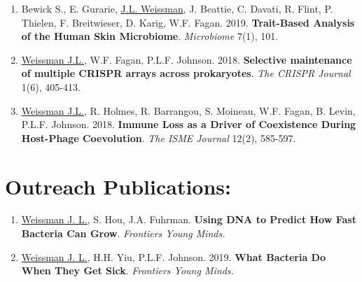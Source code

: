 \documentclass[]{res}
\begin{document}
\begin{resume}
\begin{enumerate}[leftmargin=*]
 \item Bewick S., E. Gurarie, \underline{J.L. Weissman}, J. Beattie, C. Davati, R. Flint, P. Thielen, F. Breitwieser, D. Karig, W.F. Fagan. 2019. {\bf Trait-Based Analysis of the Human Skin Microbiome}. \emph{Microbiome} 7(1), 101.  %

 \item \underline{Weissman J.L.}, W.F. Fagan, P.L.F. Johnson. 2018. {\bf Selective maintenance of multiple CRISPR arrays across prokaryotes}. \emph{The CRISPR Journal} 1(6), 405-413. %
 
\item \underline{Weissman J.L.}, R. Holmes, R. Barrangou, S. Moineau, W.F. Fagan, B. Levin, P.L.F. Johnson. 2018. {\bf Immune Loss as a Driver of Coexistence During Host-Phage Coevolution}. \emph{The ISME Journal} 12(2), 585-597. %

\end{enumerate} 
 

 
\section{Outreach Publications:} \vspace{0mm}

 \begin{enumerate}[leftmargin=*]

\item \underline{Weissman J. L.}, S. Hou, J.A. Fuhrman. {\bf Using DNA to Predict How Fast Bacteria Can Grow}. \emph{Frontiers Young Minds.}

\item \underline{Weissman J. L.}, H.H. Yiu, P.L.F. Johnson. 2019. {\bf What Bacteria Do When They Get Sick}. \emph{Frontiers Young Minds.}


  \end{enumerate} 
  

\end{resume}
\end{document}

